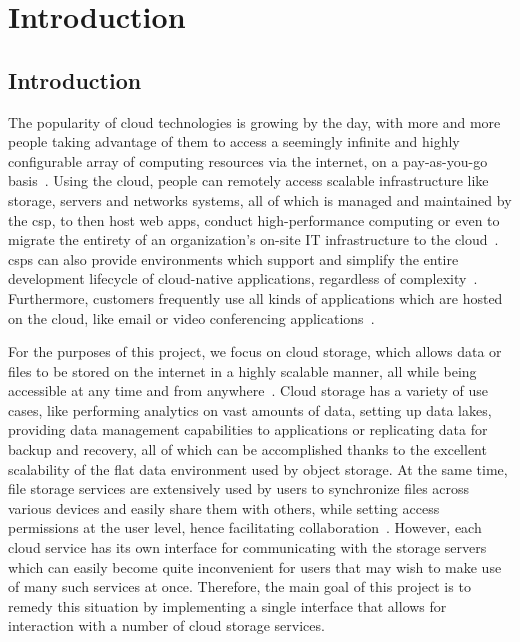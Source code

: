 \chapter{Introduction}

\section{Introduction}
The popularity of cloud technologies is growing by the day, with more and more people taking advantage of them to access a seemingly infinite and highly configurable array of computing resources via the internet, on a pay-as-you-go basis~\cite{gvr}. Using the cloud, people can remotely access scalable infrastructure like storage, servers and networks systems, all of which is managed and maintained by the \ac{csp}, to then host web apps, conduct high-performance computing or even to migrate the entirety of an organization's on-site IT infrastructure to the cloud~\cite{iaas}. \acp{csp} can also provide environments which support and simplify the entire development lifecycle of cloud-native applications, regardless of complexity~\cite{paas}. Furthermore, customers frequently use all kinds of applications which are hosted on the cloud, like email or video conferencing applications~\cite{saas}.

For the purposes of this project, we focus on cloud storage, which allows data or files to be stored on the internet in a highly scalable manner, all while being accessible at any time and from anywhere~\cite{s3_cloud_storage}. Cloud storage has a variety of use cases, like performing analytics on vast amounts of data, setting up data lakes, providing data management capabilities to applications or replicating data for backup and recovery, all of which can be accomplished thanks to the excellent scalability of the flat data environment used by object storage. At the same time, file storage services are extensively used by users to synchronize files across various devices and easily share them with others, while setting access permissions at the user level, hence facilitating collaboration~\cite{objectvsfile,objectvsfile2}. However, each cloud service has its own interface for communicating with the storage servers which can easily become quite inconvenient for users that may wish to make use of many such services at once. Therefore, the main goal of this project is to remedy this situation by implementing a single interface that allows for interaction with a number of cloud storage services.

